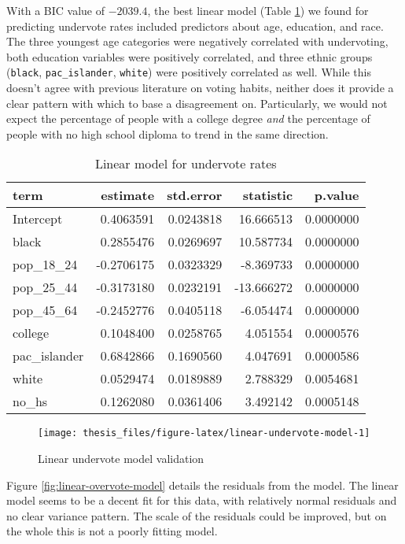 \documentclass[12pt,twoside]{reedthesis}
\begin{document}
With a BIC value of \(-2039.4\), the best linear model (Table \ref{tab:linear-undervote-model}) we found for predicting undervote rates included predictors about age, education, and race. The three youngest age categories were negatively correlated with undervoting, both education variables were positively correlated, and three ethnic groups (\texttt{black}, \texttt{pac\_islander}, \texttt{white}) were positively correlated as well. While this doesn't agree with previous literature on voting habits, neither does it provide a clear pattern with which to base a disagreement on. Particularly, we would not expect the percentage of people with a college degree \emph{and} the percentage of people with no high school diploma to trend in the same direction.
\begin{table}[t]

\caption[Linear undervote model]{\label{tab:linear-undervote-model}Linear model for undervote rates}
\centering
\begin{tabular}{lrrrr}
\toprule
term & estimate & std.error & statistic & p.value\\
\midrule
Intercept & 0.4063591 & 0.0243818 & 16.666513 & 0.0000000\\
black & 0.2855476 & 0.0269697 & 10.587734 & 0.0000000\\
pop\_18\_24 & -0.2706175 & 0.0323329 & -8.369733 & 0.0000000\\
pop\_25\_44 & -0.3173180 & 0.0232191 & -13.666272 & 0.0000000\\
pop\_45\_64 & -0.2452776 & 0.0405118 & -6.054474 & 0.0000000\\
\addlinespace
college & 0.1048400 & 0.0258765 & 4.051554 & 0.0000576\\
pac\_islander & 0.6842866 & 0.1690560 & 4.047691 & 0.0000586\\
white & 0.0529474 & 0.0189889 & 2.788329 & 0.0054681\\
no\_hs & 0.1262080 & 0.0361406 & 3.492142 & 0.0005148\\
\bottomrule
\end{tabular}
\end{table}
\begin{figure}
\texttt{[image: thesis\_files/figure-latex/linear-undervote-model-1]} \caption{Linear undervote model validation}\label{fig:linear-undervote-model}
\end{figure}
Figure \ref{fig:linear-overvote-model} details the residuals from the model. The linear model seems to be a decent fit for this data, with relatively normal residuals and no clear variance pattern. The scale of the residuals could be improved, but on the whole this is not a poorly fitting model.
\end{document}
